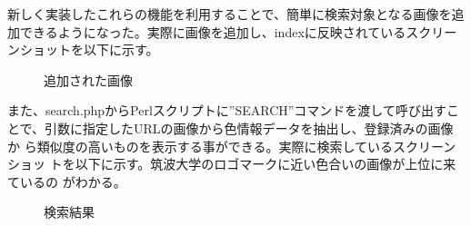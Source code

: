\documentclass[a4paper,9pt]{jsarticle}
\begin{document}
新しく実装したこれらの機能を利用することで、簡単に検索対象となる画像を追
加できるようになった。実際に画像を追加し、indexに反映されているスクリー
ンショットを以下に示す。
\begin{figure}[H]
 \caption{追加された画像}
 \begin{center}
 \end{center}
\end{figure}
また、search.phpからPerlスクリプトに''SEARCH''コマンドを渡して呼び出すこ
とで、引数に指定したURLの画像から色情報データを抽出し、登録済みの画像か
ら類似度の高いものを表示する事ができる。実際に検索しているスクリーンショッ
トを以下に示す。筑波大学のロゴマークに近い色合いの画像が上位に来ているの
がわかる。

\begin{figure}[H]
 \caption{検索結果}
 \begin{center}
 \end{center}
\end{figure}
\end{document}
